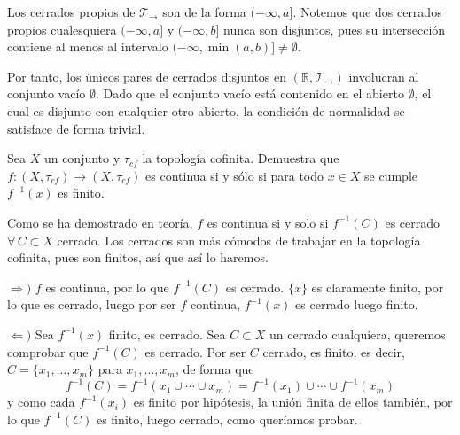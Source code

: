 \begin{sol}
    Los cerrados propios de $\mathcal{T}_{\rightarrow}$ son de la forma $(-\infty, a]$. Notemos que dos cerrados propios cualesquiera $(-\infty, a]$ y $(-\infty, b]$ nunca son disjuntos, pues su intersección contiene al menos al intervalo $(-\infty, \min(a,b)] \neq \emptyset$.
    
    Por tanto, los únicos pares de cerrados disjuntos en $(\mathbb{R}, \mathcal{T}_{\rightarrow})$ involucran al conjunto vacío $\emptyset$. Dado que el conjunto vacío está contenido en el abierto $\emptyset$, el cual es disjunto con cualquier otro abierto, la condición de normalidad se satisface de forma trivial.
\end{sol}
\begin{ejer}
    [88] Sea $X$ un conjunto y $\tau_{cf}$ la topología cofinita. Demuestra que $f: (X, \tau_{cf}) \longrightarrow (X, \tau_{cf})$ es continua si y sólo si para todo $x \in X$ se cumple $f^{-1}(x)$ es finito.
\end{ejer}
\begin{sol}
    Como se ha demostrado en teor\'ia, $f$ es continua si y solo si $f^{-1}(C)$ es cerrado $\forall \, C \subset X$ cerrado. Los cerrados son m\'as c\'omodos de trabajar en la topolog\'ia cofinita, pues son finitos, as\'i que as\'i lo haremos. 

    $\Rightarrow)$ $f$ es continua, por lo que $f^{-1}(C)$ es cerrado. $\{x\}$ es claramente finito, por lo que es cerrado, luego por ser $f$ continua, $f^{-1}(x)$ es cerrado luego finito.

    $\Leftarrow)$ Sea $f^{-1}(x)$ finito, es cerrado. Sea $C \subset X$ un cerrado cualquiera, queremos comprobar que $f^{-1}(C)$ es cerrado. Por ser $C$ cerrado, es finito, es decir, $C = \{x_1, \ldots, x_m\}$ para $x_1, \ldots, x_m$, de forma que 
    $$f^{-1}(C) = f^{-1}(x_1\cup \cdots\cup x_m) = f^{-1}(x_1) \cup \cdots \cup f^{-1}(x_m)$$
    y como cada $f^{-1}(x_i)$ es finito por hip\'otesis, la uni\'on finita de ellos tambi\'en, por lo que $f^{-1}(C)$ es finito, luego cerrado, como quer\'iamos probar. 
\end{sol}
